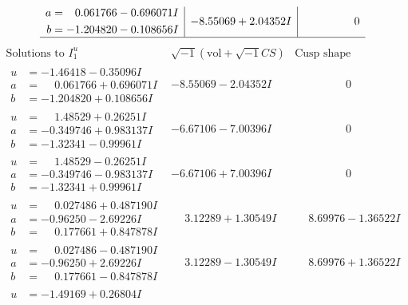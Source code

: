 \documentclass[1p]{elsarticle_modified}
\theoremstyle{definition}
\newcommand{\I}{\sqrt{-1}}
\begin{document}
$$\begin{array}{c|c|c}
\begin{aligned}
a &= \phantom{-}0.061766 - 0.696071 I \\
b &= -1.204820 - 0.108656 I\end{aligned}
 & -8.55069 + 2.04352 I & \phantom{-0.000000 } 0\\
 \hline 
 \end{array}$$\newpage$$\begin{array}{c|c|c}  
\text{Solutions to }I^u_{1}& \I (\text{vol} + \sqrt{-1}CS) & \text{Cusp shape}\\
 \hline 
\begin{aligned}
u &= -1.46418 - 0.35096 I \\
a &= \phantom{-}0.061766 + 0.696071 I \\
b &= -1.204820 + 0.108656 I\end{aligned}
 & -8.55069 - 2.04352 I & \phantom{-0.000000 } 0 \\ \hline\begin{aligned}
u &= \phantom{-}1.48529 + 0.26251 I \\
a &= -0.349746 + 0.983137 I \\
b &= -1.32341 - 0.99961 I\end{aligned}
 & -6.67106 - 7.00396 I & \phantom{-0.000000 } 0 \\ \hline\begin{aligned}
u &= \phantom{-}1.48529 - 0.26251 I \\
a &= -0.349746 - 0.983137 I \\
b &= -1.32341 + 0.99961 I\end{aligned}
 & -6.67106 + 7.00396 I & \phantom{-0.000000 } 0 \\ \hline\begin{aligned}
u &= \phantom{-}0.027486 + 0.487190 I \\
a &= -0.96250 - 2.69226 I \\
b &= \phantom{-}0.177661 + 0.847878 I\end{aligned}
 & \phantom{-}3.12289 + 1.30549 I & \phantom{-}8.69976 - 1.36522 I \\ \hline\begin{aligned}
u &= \phantom{-}0.027486 - 0.487190 I \\
a &= -0.96250 + 2.69226 I \\
b &= \phantom{-}0.177661 - 0.847878 I\end{aligned}
 & \phantom{-}3.12289 - 1.30549 I & \phantom{-}8.69976 + 1.36522 I \\ \hline\begin{aligned}
u &= -1.49169 + 0.26804 I \\

\end{aligned}
\end{array}$$
\end{document}
